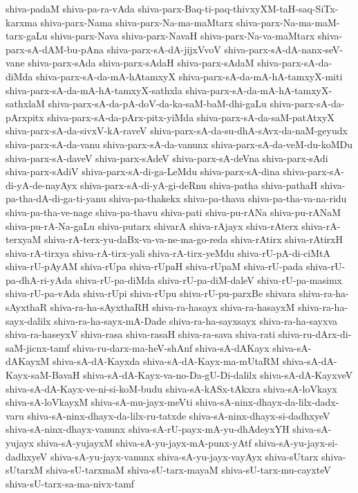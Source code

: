 {shiva-padaM
shiva-pa-ra-vAda
shiva-parx-Baq-ti-paq-thivxyXM-taH-saq-SiTx-karxma
shiva-parx-Nama
shiva-parx-Na-ma-maMtarx
shiva-parx-Na-ma-maM-tarx-gaLu
shiva-parx-Nava
shiva-parx-NavaH
shiva-parx-Na-va-maMtarx
shiva-parx-sA-dAM-bu-pAna
shiva-parx-sA-dA-jijxVvoV
shiva-parx-sA-dA-nanx-seV-vane
shiva-parx-sAda
shiva-parx-sAdaH
shiva-parx-sAdaM
shiva-parx-sA-da-diMda
shiva-parx-sA-da-mA-hAtamxyX
shiva-parx-sA-da-mA-hA-tamxyX-miti
shiva-parx-sA-da-mA-hA-tamxyX-sathxla
shiva-parx-sA-da-mA-hA-tamxyX-sathxlaM
shiva-parx-sA-da-pA-doV-da-ka-saM-baM-dhi-gaLu
shiva-parx-sA-da-pArxpitx
shiva-parx-sA-da-pArx-pitx-yiMda
shiva-parx-sA-da-saM-patAtxyX
shiva-parx-sA-da-sivxV-kA-raveV
shiva-parx-sA-da-su-dhA-sAvx-da-naM-geyudx
shiva-parx-sA-da-vanu
shiva-parx-sA-da-vanunx
shiva-parx-sA-da-veM-du-koMDu
shiva-parx-sA-daveV
shiva-parx-sAdeV
shiva-parx-sA-deVna
shiva-parx-sAdi
shiva-parx-sAdiV
shiva-parx-sA-di-ga-LeMdu
shiva-parx-sA-dina
shiva-parx-sA-di-yA-de-nayAyx
shiva-parx-sA-di-yA-gi-deRnu
shiva-patha
shiva-pathaH
shiva-pa-tha-dA-di-ga-ti-yanu
shiva-pa-thakekx
shiva-pa-thava
shiva-pa-tha-va-na-ridu
shiva-pa-tha-ve-nage
shiva-pa-thavu
shiva-pati
shiva-pu-rANa
shiva-pu-rANaM
shiva-pu-rA-Na-gaLu
shiva-putarx
shivarA
shiva-rAjayx
shiva-rAterx
shiva-rA-terxyaM
shiva-rA-terx-yu-daBx-va-va-ne-ma-go-reda
shiva-rAtirx
shiva-rAtirxH
shiva-rA-tirxya
shiva-rA-tirx-yali
shiva-rA-tirx-yeMdu
shiva-rU-pA-di-ciMtA
shiva-rU-pAyAM
shiva-rUpa
shiva-rUpaH
shiva-rUpaM
shiva-rU-pada
shiva-rU-pa-dhA-ri-yAda
shiva-rU-pa-diMda
shiva-rU-pa-diM-daleV
shiva-rU-pa-masimx
shiva-rU-pa-vAda
shiva-rUpi
shiva-rUpu
shiva-rU-pu-parxBe
shivara
shiva-ra-ha-sAyxthaR
shiva-ra-ha-sAyxthaRH
shiva-ra-hasayx
shiva-ra-hasayxM
shiva-ra-ha-sayx-dalilx
shiva-ra-ha-sayx-mA-Dade
shiva-ra-ha-sayxsayx
shiva-ra-ha-sayxva
shiva-ra-haseyxV
shiva-rasa
shiva-rasaH
shiva-ra-sava
shiva-rati
shiva-ru-dArx-di-saM-jicnx-tamf
shiva-ru-darx-ma-heV-shAnf
shiva-sA-dAKayx
shiva-sA-dAKayxM
shiva-sA-dA-Kayxda
shiva-sA-dA-Kayx-ma-mUtaRM
shiva-sA-dA-Kayx-saM-BavaH
shiva-sA-dA-Kayx-va-no-Da-gU-Di-dalilx
shiva-sA-dA-KayxveV
shiva-sA-dA-Kayx-ve-ni-si-koM-budu
shiva-sA-kASx-tAkxra
shiva-sA-loVkayx
shiva-sA-loVkayxM
shiva-sA-mu-jayx-meVti
shiva-sA-ninx-dhayx-da-lilx-dadx-varu
shiva-sA-ninx-dhayx-da-lilx-ru-tatxde
shiva-sA-ninx-dhayx-si-dadhxyeV
shiva-sA-ninx-dhayx-vanunx
shiva-sA-rU-payx-mA-yu-dhAdeyxYH
shiva-sA-yujayx
shiva-sA-yujayxM
shiva-sA-yu-jayx-mA-punx-yAtf
shiva-sA-yu-jayx-si-dadhxyeV
shiva-sA-yu-jayx-vanunx
shiva-sA-yu-jayx-vayAyx
shiva-sUtarx
shiva-sUtarxM
shiva-sU-tarxmaM
shiva-sU-tarx-mayaM
shiva-sU-tarx-mu-cayxteV
shiva-sU-tarx-sa-ma-nivx-tamf
}
